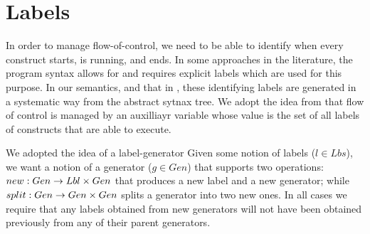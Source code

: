 \section{Labels}\label{sec:labels}

In order to manage flow-of-control,
we need to be able to identify when every construct starts,
is running, and ends.
In some approaches in the literature, the program syntax
allows for and requires explicit labels which are used for this purpose.
In our semantics, and that in \cite{DBLP:journals/cacm/Lamport15a},
these identifying labels are generated in a systematic way from
the abstract sytnax tree.
We adopt the idea from \cite{DBLP:conf/icfem/WoodcockH02} that flow of control is managed by an auxilliayr variable whose value is the
set of all labels of constructs that are able to execute.


We adopted the idea of a label-generator
Given some notion of labels ($l \in Lbs$),
we want a notion of a generator ($g \in Gen$) that supports two operations:
$new:Gen \rightarrow Lbl \times Gen$ that produces a new label and a new generator;
while
$split:Gen \rightarrow Gen \times Gen$ splits a generator into two new ones.
In all cases we require that any labels obtained from new generators
will not have been obtained previously from any of their parent generators.

